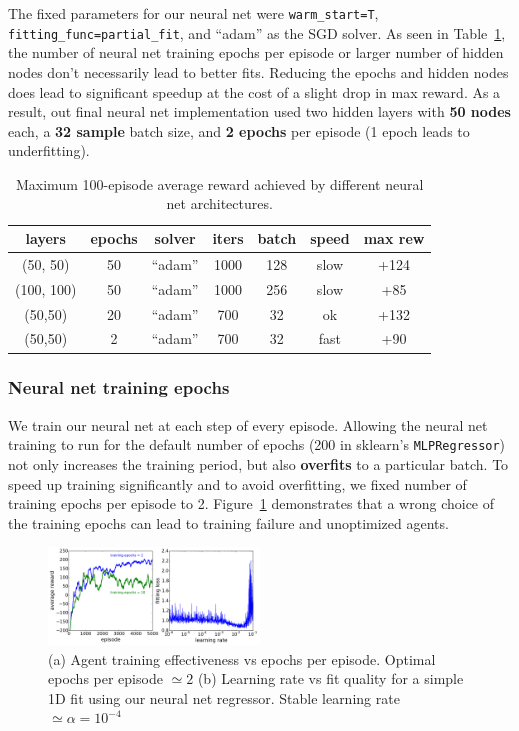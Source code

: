 \documentclass[conference]{IEEEtran}
\begin{document}
The fixed parameters for our neural net were {\tt warm\_start=T}, {\tt fitting\_func=partial\_fit}, and ``adam'' as the SGD solver. As seen in Table~\ref{tab:nnarch}, the number of neural net training epochs per episode or larger number of hidden nodes don't necessarily lead to better fits. Reducing the epochs and hidden nodes does lead to significant speedup at the cost of a slight drop in max reward. As a result, out final neural net implementation used two hidden layers with {\bf 50 nodes} each, a {\bf 32 sample} batch size, and {\bf 2 epochs} per episode (1 epoch leads to underfitting). 
\begin{table}[bpht]
\begin{center}
\begin{tabular}{|c|c|c|c|c|c|c|}
\hline
layers & epochs & solver & iters & batch & speed & max rew\\ \hline 
(50, 50) & 50 & ``adam'' & 1000 & 128 & slow & +124 \\
(100, 100) & 50 & ``adam'' & 1000 & 256 & slow & +85 \\
(50,50) & 20 & ``adam'' & 700 & 32 & ok & +132 \\
(50,50) & 2 & ``adam'' & 700 & 32 & fast & +90 \\ \hline
\end{tabular}
\end{center}
\caption{Maximum 100-episode average reward achieved by different neural net architectures. \label{tab:nnarch}}
\end{table}
\subsubsection {Neural net training epochs}
We train our neural net at each step of every episode. Allowing the neural net training to run for the default number of  epochs (200 in sklearn's {\tt MLPRegressor}) not only increases the training period, but also {\bf overfits} to a particular batch. To speed up training significantly and to avoid overfitting, we fixed number of training epochs per episode to 2. Figure~\ref{fig:lr} demonstrates that a wrong choice of the training epochs can lead to training failure and unoptimized agents.
\begin{figure}[tbp]
    \centering
    \includegraphics[width=0.5\textwidth]{./figures/fig0.pdf}
    \caption{(a) Agent training effectiveness vs epochs per episode. Optimal epochs per episode $\simeq 2$ (b) Learning rate vs fit quality for a simple 1D fit using our neural net regressor. Stable learning rate $\simeq \alpha=10^{-4}$ \label{fig:lr}}
\end{figure}
\end{document}
